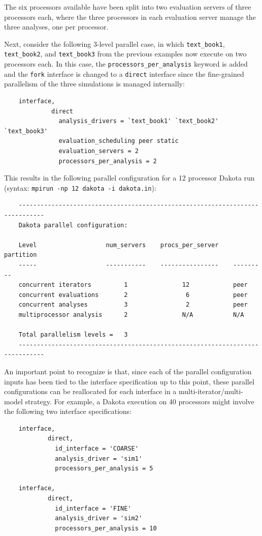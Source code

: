 The six processors available have been split into two evaluation
servers of three processors each, where the three processors in each
evaluation server manage the three analyses, one per processor.

Next, consider the following 3-level parallel case, in which
\texttt{text\_book1}, \texttt{text\_book2}, and \texttt{text\_book3}
from the previous examples now execute on two processors each. In this
case, the \texttt{processors\_per\_analysis} keyword is added and the
\texttt{fork} interface is changed to a \texttt{direct} interface
since the fine-grained parallelism of the three simulations is managed
internally:
\begin{small}
\begin{verbatim}
    interface,
             direct
               analysis_drivers = `text_book1' `text_book2' `text_book3'
               evaluation_scheduling peer static
               evaluation_servers = 2
               processors_per_analysis = 2
\end{verbatim}
\end{small}

This results in the following parallel configuration for a 12
processor Dakota run \\
(syntax: \texttt{mpirun -np 12 dakota -i dakota.in}):
\begin{small}
\begin{verbatim}
    -----------------------------------------------------------------------------
    Dakota parallel configuration:

    Level                   num_servers    procs_per_server    partition
    -----                   -----------    ----------------    ---------
    concurrent iterators         1               12            peer
    concurrent evaluations       2                6            peer
    concurrent analyses          3                2            peer
    multiprocessor analysis      2               N/A           N/A

    Total parallelism levels =   3
    -----------------------------------------------------------------------------
\end{verbatim}
\end{small}

An important point to recognize is that, since each of the parallel
configuration inputs has been tied to the interface specification up
to this point, these parallel configurations can be reallocated for
each interface in a multi-iterator/multi-model strategy. For example,
a Dakota execution on 40 processors might involve the following two
interface specifications:
\begin{small}
\begin{verbatim}
    interface,
            direct,
              id_interface = 'COARSE'
              analysis_driver = 'sim1'
              processors_per_analysis = 5

    interface,
            direct,
              id_interface = 'FINE'
              analysis_driver = 'sim2'
              processors_per_analysis = 10
\end{verbatim}
\end{small}

